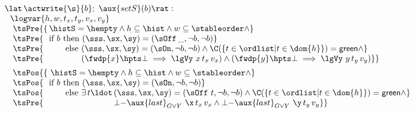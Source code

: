 %
\[
\begin{array}{l}
\lat\,\actwrite{\s}{b};\ \aux{setS}(b) \rat :\\
~~ \logvar{h,w,t_x,t_y,v_x,v_y}\\
~~~
   \tsPre{\{\, \histS = \hempty \wedge h \subseteq \hist \wedge
                    w \subseteq \stableorder \wedge}\\
~~~
   \tsPre{\phantom{\{\,}
   \textrm{if}\ b~
   \textrm{then}\ (\sss, \sx, \sy) = (\sOff\,\_, \neg b, \neg b)} \\
~~~
\tsPre{\phantom{\{,\textrm{if}\ b~}
   \textrm{else}\ (\sss, \sx, \sy) = (\sOn, \neg b, \neg b) \wedge
  \C(\{ t \in \ordlist | t \in \dom{h}\}) = \mathsf{green} \wedge}\\
~~~
\tsPre{\phantom{\{,\textrm{if}\ b\ \textrm{else}}\
       (\fwdp{x} \hpts \bot \implies \lgVy\ x\, t_x\, v_x) \wedge
       (\fwdp{y} \hpts \bot \implies \lgVy\ y\, t_y\, v_y)\}}\\[5pt]
~~~
   \tsPos{\{\ \histS = \hempty \wedge h \subseteq \hist \wedge
                    w \subseteq \stableorder \wedge}\\
~~~
   \tsPos{\phantom{\{\,}
   \textrm{if}\ b~
   \textrm{then}\ (\sss, \sx, \sy) = (\sOn, \neg b, \neg b)} \\
~~~
\tsPos{\phantom{\{,\textrm{if}\ b~}
   \textrm{else}\ \exists\, t\ldot\,
         (\sss, \sx, \sy) = (\sOff\ t, \neg b, \neg b) \wedge
  \C(\{ t \in \ordlist | t \in \dom{h}\}) = \mathsf{green} \wedge}\\
~~~
\tsPre{\phantom{\{,\textrm{if}\ b~\textrm{else}\ \exists\, t\ldot\,}
       \bot{-}\aux{last}_{G \vee Y}\ \x\, t_x\, v_x \wedge
       \bot{-}\aux{last}_{G \vee Y}\ \y\, t_y\, v_y \}}
\end{array}
\]



